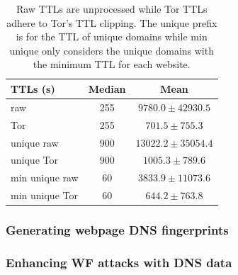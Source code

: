 \begin{table}[t]
	\centering
	\begin{tabular}{l c c}
	\toprule
	\textbf{TTLs (s)} & \textbf{Median} & \textbf{Mean} \\
	\midrule
	raw & 255 & $9780.0\pm42930.5$ \\ %
	Tor & 255 & $701.5\pm755.3$ \\ %
	unique raw & 900 & $13022.2\pm35054.4$ \\ %
	unique Tor & 900 & $1005.3\pm789.6$ \\ %
	min unique raw & 60 & $3833.9\pm11073.6$ \\ %
	min unique Tor & 60 & $644.2\pm763.8$ \\ %
	\bottomrule
	\end{tabular}
	\caption{%
	Raw TTLs are unprocessed while Tor TTLs adhere to Tor's TTL clipping.
	The unique prefix is for the TTL of unique domains while min unique only
	considers the unique domains with the minimum TTL for each website.}
	\label{tab:daw-ttls}
\end{table}

\subsubsection{Generating webpage DNS fingerprints}

\subsubsection{Enhancing WF attacks with DNS data}

